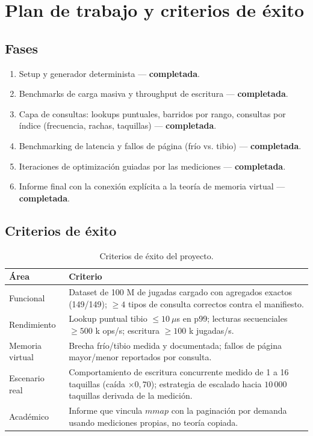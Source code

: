 \documentclass[12pt, letterpaper]{article}
\begin{document}
\section{Plan de trabajo y criterios de éxito}

\subsection{Fases}

\begin{enumerate}
    \item Setup y generador determinista --- \textbf{completada}.
    \item Benchmarks de carga masiva y throughput de escritura ---
    \textbf{completada}.
    \item Capa de consultas: lookups puntuales, barridos por rango,
    consultas por índice (frecuencia, rachas, taquillas) ---
    \textbf{completada}.
    \item Benchmarking de latencia y fallos de página (frío vs. tibio) ---
    \textbf{completada}.
    \item Iteraciones de optimización guiadas por las mediciones ---
    \textbf{completada}.
    \item Informe final con la conexión explícita a la teoría de memoria
    virtual --- \textbf{completada}.
\end{enumerate}

\subsection{Criterios de éxito}

\begin{table}[H]
\centering
\caption{Criterios de éxito del proyecto.}
\label{tab:criterios}
\begin{tabular}{@{}p{4.2cm} p{9.5cm}@{}}
\toprule
\textbf{Área} & \textbf{Criterio} \\
\midrule
Funcional & Dataset de 100 M de jugadas cargado con agregados exactos
(149/149); $\geq 4$ tipos de consulta correctos contra el manifiesto. \\
Rendimiento & Lookup puntual tibio $\leq 10~\mu$s en p99; lecturas
secuenciales $\geq 500$ k ops/s; escritura $\geq 100$ k jugadas/s. \\
Memoria virtual & Brecha frío/tibio medida y documentada; fallos de página
mayor/menor reportados por consulta. \\
Escenario real & Comportamiento de escritura concurrente medido de 1 a 16
taquillas (caída $\times 0{,}70$); estrategia de escalado hacia $10\,000$
taquillas derivada de la medición. \\
Académico & Informe que vincula $mmap$ con la paginación por demanda usando
mediciones propias, no teoría copiada. \\
\bottomrule
\end{tabular}
\end{table}
\end{document}
